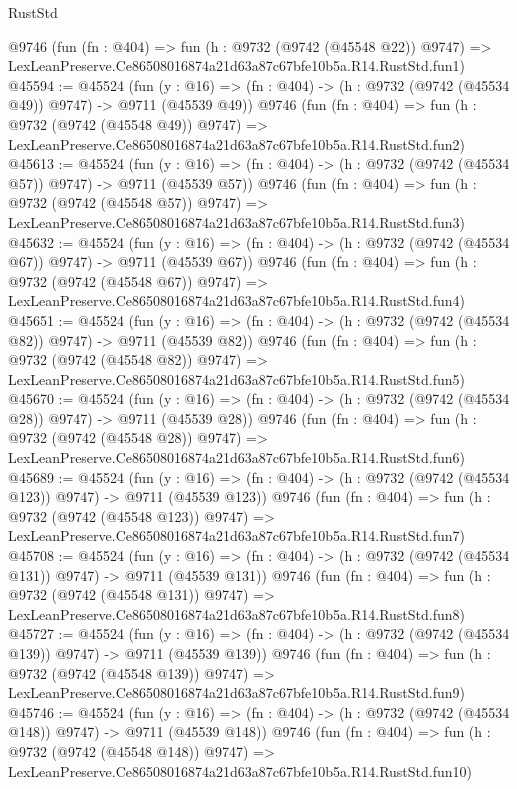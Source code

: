 \begin{lexlean}{RustStd}
\begin{coremodule}
    @9746
    (fun (fn : @404) =>
    fun (h : @9732 (@9742 (@45548 @22)) @9747) =>
    LexLeanPreserve.Ce86508016874a21d63a87c67bfe10b5a.R14.RustStd.fun1)
@45594 := @45524
    (fun (y : @16) => (fn : @404) -> (h : @9732 (@9742 (@45534 @49)) @9747) -> @9711 (@45539 @49))
    @9746
    (fun (fn : @404) =>
    fun (h : @9732 (@9742 (@45548 @49)) @9747) =>
    LexLeanPreserve.Ce86508016874a21d63a87c67bfe10b5a.R14.RustStd.fun2)
@45613 := @45524
    (fun (y : @16) => (fn : @404) -> (h : @9732 (@9742 (@45534 @57)) @9747) -> @9711 (@45539 @57))
    @9746
    (fun (fn : @404) =>
    fun (h : @9732 (@9742 (@45548 @57)) @9747) =>
    LexLeanPreserve.Ce86508016874a21d63a87c67bfe10b5a.R14.RustStd.fun3)
@45632 := @45524
    (fun (y : @16) => (fn : @404) -> (h : @9732 (@9742 (@45534 @67)) @9747) -> @9711 (@45539 @67))
    @9746
    (fun (fn : @404) =>
    fun (h : @9732 (@9742 (@45548 @67)) @9747) =>
    LexLeanPreserve.Ce86508016874a21d63a87c67bfe10b5a.R14.RustStd.fun4)
@45651 := @45524
    (fun (y : @16) => (fn : @404) -> (h : @9732 (@9742 (@45534 @82)) @9747) -> @9711 (@45539 @82))
    @9746
    (fun (fn : @404) =>
    fun (h : @9732 (@9742 (@45548 @82)) @9747) =>
    LexLeanPreserve.Ce86508016874a21d63a87c67bfe10b5a.R14.RustStd.fun5)
@45670 := @45524
    (fun (y : @16) => (fn : @404) -> (h : @9732 (@9742 (@45534 @28)) @9747) -> @9711 (@45539 @28))
    @9746
    (fun (fn : @404) =>
    fun (h : @9732 (@9742 (@45548 @28)) @9747) =>
    LexLeanPreserve.Ce86508016874a21d63a87c67bfe10b5a.R14.RustStd.fun6)
@45689 := @45524
    (fun (y : @16) => (fn : @404) -> (h : @9732 (@9742 (@45534 @123)) @9747) -> @9711 (@45539 @123))
    @9746
    (fun (fn : @404) =>
    fun (h : @9732 (@9742 (@45548 @123)) @9747) =>
    LexLeanPreserve.Ce86508016874a21d63a87c67bfe10b5a.R14.RustStd.fun7)
@45708 := @45524
    (fun (y : @16) => (fn : @404) -> (h : @9732 (@9742 (@45534 @131)) @9747) -> @9711 (@45539 @131))
    @9746
    (fun (fn : @404) =>
    fun (h : @9732 (@9742 (@45548 @131)) @9747) =>
    LexLeanPreserve.Ce86508016874a21d63a87c67bfe10b5a.R14.RustStd.fun8)
@45727 := @45524
    (fun (y : @16) => (fn : @404) -> (h : @9732 (@9742 (@45534 @139)) @9747) -> @9711 (@45539 @139))
    @9746
    (fun (fn : @404) =>
    fun (h : @9732 (@9742 (@45548 @139)) @9747) =>
    LexLeanPreserve.Ce86508016874a21d63a87c67bfe10b5a.R14.RustStd.fun9)
@45746 := @45524
    (fun (y : @16) => (fn : @404) -> (h : @9732 (@9742 (@45534 @148)) @9747) -> @9711 (@45539 @148))
    @9746
    (fun (fn : @404) =>
    fun (h : @9732 (@9742 (@45548 @148)) @9747) =>
    LexLeanPreserve.Ce86508016874a21d63a87c67bfe10b5a.R14.RustStd.fun10)

\end{coremodule}
\end{lexlean}
